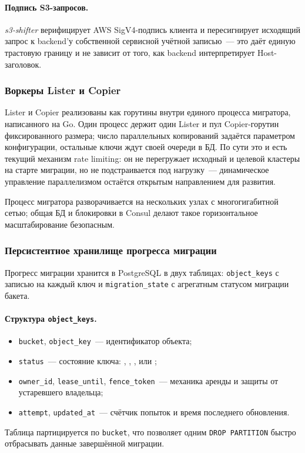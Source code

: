 \paragraph{Подпись S3-запросов.}
\textit{s3-shifter} верифицирует AWS SigV4-подпись клиента и пересигнирует исходящий запрос к backend'у собственной сервисной учётной записью~--- это даёт единую трастовую границу и не зависит от того, как backend интерпретирует Host-заголовок.

\subsubsection{Воркеры Lister и Copier}\label{subsubsec:workers}

Lister и Copier реализованы как горутины внутри единого процесса мигратора, написанного на Go.
Один процесс держит один Lister и пул Copier-горутин фиксированного размера; число параллельных копирований задаётся параметром конфигурации, остальные ключи ждут своей очереди в БД.
По сути это и есть текущий механизм rate limiting: он не перегружает исходный и целевой кластеры на старте миграции, но не подстраивается под нагрузку~--- динамическое управление параллелизмом остаётся открытым направлением для развития.

Процесс мигратора разворачивается на нескольких узлах с многогигабитной сетью; общая БД и блокировки в Consul делают такое горизонтальное масштабирование безопасным.

\subsubsection{Персистентное хранилище прогресса миграции}\label{subsubsec:persistent-store}

Прогресс миграции хранится в PostgreSQL в двух таблицах: \texttt{object\_keys} с записью на каждый ключ и \texttt{migration\_state} с агрегатным статусом миграции бакета.

\paragraph{Структура \texttt{object\_keys}.}
\begin{itemize}
    \item \texttt{bucket}, \texttt{object\_key}~--- идентификатор объекта;
    \item \texttt{status}~--- состояние ключа: , , ,  или ;
    \item \texttt{owner\_id}, \texttt{lease\_until}, \texttt{fence\_token}~--- механика аренды и защиты от устаревшего владельца;
    \item \texttt{attempt}, \texttt{updated\_at}~--- счётчик попыток и время последнего обновления.
\end{itemize}
Таблица партицируется по \texttt{bucket}, что позволяет одним \texttt{DROP PARTITION} быстро отбрасывать данные завершённой миграции.

